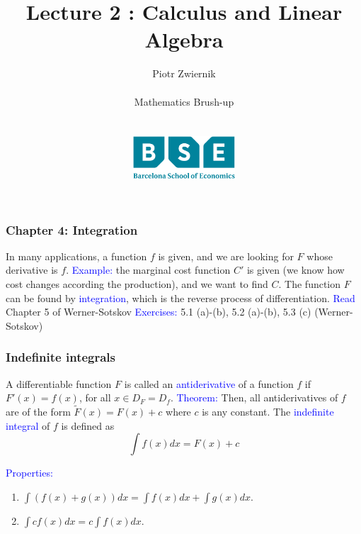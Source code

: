 \documentclass[11pt,aspectratio=169]{beamer}
\title[Calculus and Linear Algebra]{Lecture 2 : Calculus and Linear Algebra}
\author[Piotr Zwiernik, Barcelona School of Economics]{Piotr Zwiernik \\ $\;$\\
Mathematics Brush-up\\ $\;$\\ $\;$\\
\includegraphics[width=1.5in]{img/bse.png}  
}
\date{}
\begin{document}
\begin{frame}
\titlepage
\end{frame}






\begin{frame}
\frametitle{Chapter 4: Integration}
\begin{small}
 In many applications, a function $f$ is given, and we are looking for $F$ whose derivative is $f$.
\vskip 12pt
\textcolor{blue}{Example:} the marginal cost function $C'$ is given (we know how cost changes according the production), and we want to find $C$.
\vskip 12pt
The function $F$ can be found by \textcolor{blue}{integration}, which is the reverse process of differentiation.
\vskip 12pt
\textcolor{blue}{Read}  Chapter 5 of Werner-Sotskov 
\vskip 12pt
\textcolor{blue}{Exercises:} 5.1 (a)-(b), 5.2 (a)-(b), 5.3 (c) (Werner-Sotskov)


\end{small}
\end{frame}
\begin{frame}
\frametitle{Indefinite integrals}
\begin{small}
A differentiable function $F$ is called an \textcolor{blue}{antiderivative} of a function $f$ if $F'(x)=f(x)$, for all $x \in D_F=D_f$.
\vskip 12pt
\textcolor{blue}{Theorem:} Then, all antiderivatives of $f$ are of the form $\tilde{F}(x)=F(x)+c$ where $c$ is any constant.
\vskip 12pt
The \textcolor{blue}{indefinite integral} of $f$ is defined as $$\int f(x) dx=F(x)+c$$

\textcolor{blue}{Properties:}
\begin{enumerate}
\item $\int (f(x)+g(x)) dx=\int f(x) dx+\int g(x) dx$.
\item $\int cf(x) dx= c \int f(x) dx$.
\end{enumerate}




\end{small}
\end{frame}
\end{document}
